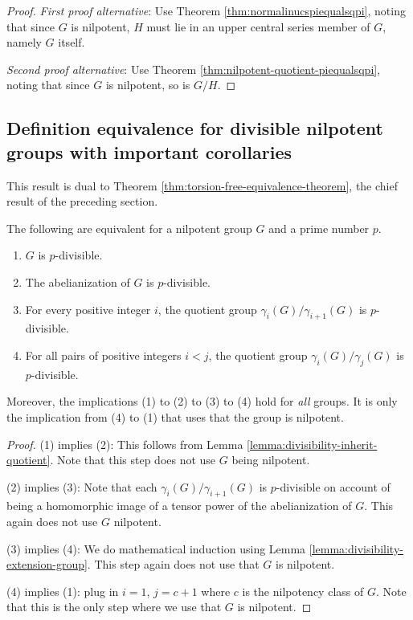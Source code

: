 \begin{proof}
  {\em First proof alternative}: Use Theorem
  \ref{thm:normalinucspiequalsqpi}, noting that since $G$ is nilpotent,
  $H$ must lie in an upper central series member of $G$, namely $G$ itself.

  {\em Second proof alternative}: Use Theorem
  \ref{thm:nilpotent-quotient-piequalsqpi}, noting that since $G$ is
  nilpotent, so is $G/H$.
\end{proof}

\subsection{Definition equivalence for divisible nilpotent groups with important corollaries}

This result is dual to Theorem \ref{thm:torsion-free-equivalence-theorem},
the chief result of the preceding section.

\begin{theorem}\label{thm:divisibility-equivalence-theorem}
  The following are equivalent for a nilpotent group $G$ and a prime
  number $p$.

  \begin{enumerate}
  \item $G$ is $p$-divisible.
  \item The abelianization of $G$ is $p$-divisible.
  \item For every positive integer $i$, the quotient group
    $\gamma_i(G)/\gamma_{i+1}(G)$ is $p$-divisible.
  \item For all pairs of positive integers $i < j$, the quotient group
    $\gamma_i(G)/\gamma_j(G)$ is $p$-divisible.
  \end{enumerate}

  Moreover, the implications (1) to (2) to (3) to (4) hold for
  {\em all} groups. It is only the implication from (4) to (1) that
  uses that the group is nilpotent.
\end{theorem}

\begin{proof}
  (1) implies (2): This follows from Lemma
  \ref{lemma:divisibility-inherit-quotient}. Note that this step does
  not use $G$ being nilpotent.

  (2) implies (3): Note that each $\gamma_i(G)/\gamma_{i+1}(G)$ is
  $p$-divisible on account of being a homomorphic image of a tensor
  power of the abelianization of $G$. This again does not use $G$ nilpotent.

  (3) implies (4): We do mathematical induction using Lemma
  \ref{lemma:divisibility-extension-group}. This step again does not use
  that $G$ is nilpotent.

  (4) implies (1): plug in $i = 1$, $j = c + 1$ where $c$ is the
  nilpotency class of $G$. Note that this is the only step where we
  use that $G$ is nilpotent.
\end{proof}

